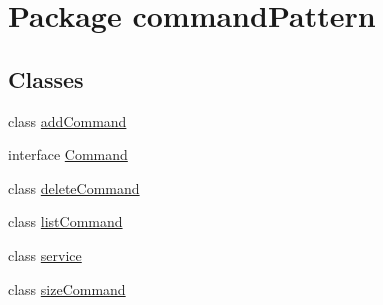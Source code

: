 \hypertarget{namespacecommand_pattern}{}\section{Package command\+Pattern}
\label{namespacecommand_pattern}
\subsection*{Classes}
\begin{DoxyCompactItemize}
\item 
class \mbox{\hyperlink{classcommand_pattern_1_1add_command}{add\+Command}}
\item 
interface \mbox{\hyperlink{interfacecommand_pattern_1_1_command}{Command}}
\item 
class \mbox{\hyperlink{classcommand_pattern_1_1delete_command}{delete\+Command}}
\item 
class \mbox{\hyperlink{classcommand_pattern_1_1list_command}{list\+Command}}
\item 
class \mbox{\hyperlink{classcommand_pattern_1_1service}{service}}
\item 
class \mbox{\hyperlink{classcommand_pattern_1_1size_command}{size\+Command}}
\end{DoxyCompactItemize}
